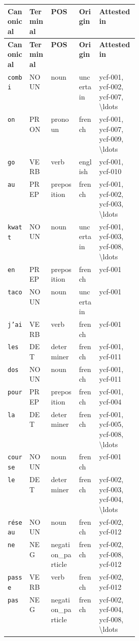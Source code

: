 \begin{longtable}{@{}llll p{0.30\linewidth}@{}}
\toprule
\textbf{Canonical} & \textbf{Terminal} & \textbf{POS} & \textbf{Origin} & \textbf{Attested in} \\
\midrule
\endfirsthead
\toprule
\textbf{Canonical} & \textbf{Terminal} & \textbf{POS} & \textbf{Origin} & \textbf{Attested in} \\
\midrule
\endhead
\bottomrule
\endfoot
\texttt{combi} & NOUN & noun & uncertain & \small ycf-001, ycf-002, ycf-007, \textbackslash{}ldots \\
\texttt{on} & PRON & pronoun & french & \small ycf-001, ycf-007, ycf-009, \textbackslash{}ldots \\
\texttt{go} & VERB & verb & english & \small ycf-001, ycf-010 \\
\texttt{au} & PREP & preposition & french & \small ycf-001, ycf-002, ycf-003, \textbackslash{}ldots \\
\texttt{kwatt} & NOUN & noun & uncertain & \small ycf-001, ycf-003, ycf-008, \textbackslash{}ldots \\
\texttt{en} & PREP & preposition & french & \small ycf-001 \\
\texttt{taco} & NOUN & noun & uncertain & \small ycf-001 \\
\texttt{j'ai} & VERB & verb & french & \small ycf-001 \\
\texttt{les} & DET & determiner & french & \small ycf-001, ycf-011 \\
\texttt{dos} & NOUN & noun & french & \small ycf-001, ycf-011 \\
\texttt{pour} & PREP & preposition & french & \small ycf-001, ycf-004 \\
\texttt{la} & DET & determiner & french & \small ycf-001, ycf-005, ycf-008, \textbackslash{}ldots \\
\texttt{course} & NOUN & noun & french & \small ycf-001 \\
\texttt{le} & DET & determiner & french & \small ycf-002, ycf-003, ycf-004, \textbackslash{}ldots \\
\texttt{réseau} & NOUN & noun & french & \small ycf-002, ycf-012 \\
\texttt{ne} & NEG & negation\_particle & french & \small ycf-002, ycf-008, ycf-012 \\
\texttt{passe} & VERB & verb & french & \small ycf-002, ycf-012 \\
\texttt{pas} & NEG & negation\_particle & french & \small ycf-002, ycf-004, ycf-008, \textbackslash{}ldots \\

\end{longtable}
